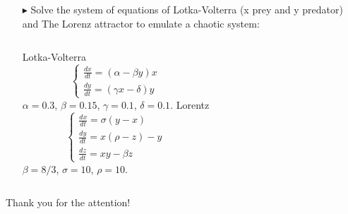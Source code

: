 \documentclass[xcolor={dvipsnames,rgb}, aspectratio=169]{beamer}
\begin{document}
\begin{frame}{}
   \begin{itemize}
      \item[$\blacktriangleright$] Solve the system of equations of Lotka-Volterra (x
         prey and y predator) and The Lorenz attractor to emulate a chaotic system:
         \begin{columns}[T]
            \centering
            Lotka-Volterra
            \begin{equation*}
               \begin{cases}
                  \frac{dx}{dt} = (\alpha - \beta y)x \\
                  \frac{dy}{dt} = (\gamma x - \delta)y
               \end{cases}
            \end{equation*}
            $\alpha = 0.3$, $\beta = 0.15$, $\gamma = 0.1$, $\delta = 0.1$.
            \centering
            Lorentz
            \begin{equation*}
               \begin{cases}
                  \frac{dx}{dt} = \sigma(y - x)\\
                  \frac{dy}{dt} = x(\rho - z) - y \\
                  \frac{dz}{dt} = xy - \beta z
               \end{cases}
            \end{equation*}
            $\beta = 8/3$, $\sigma = 10$, $\rho = 10$.
         \end{columns}
   \end{itemize}
\end{frame}


{%
\begin{frame}[standout]
	Thank you for the attention!
\end{frame}
}
\end{document}

